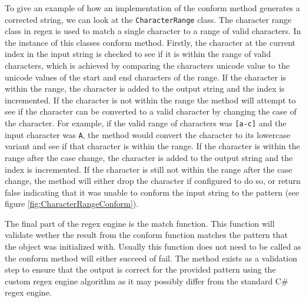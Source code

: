 
To give an example of how an implementation of the conform method generates a corrected string, we can look at the \texttt{CharacterRange} class. The character range class in regex is used to match a single character to a range of valid characters. In the instance of this classes conform method. Firstly, the character at the current index in the input string is checked to see if it is within the range of valid characters, which is achieved by comparing the characters unicode value to the unicode values of the start and end characters of the range. If the character is within the range, the character is added to the output string and the index is incremented. If the character is not within the range the method will attempt to see if the character can be converted to a valid character by changing the case of the character. For example, if the valid range of characters was \texttt{[a-c]} and the input character was \texttt{A}, the method would convert the character to its lowercase variant and see if that character is within the range. If the character is within the range after the case change, the character is added to the output string and the index is incremented. If the character is still not within the range after the case change, the method will either drop the character if configured to do so, or return false indicating that it was unable to conform the input string to the pattern (see figure \ref{fig:CharacterRangeConform}).

The final part of the regex engine is the match function. This function will validate wether the result from the conform function matches the pattern that the object was initialized with. Usually this function does not need to be called as the conform method will either succeed of fail. The method exists as a validation step to ensure that the output is correct for the provided pattern using the custom regex engine algorithm as it may possibly differ from the standard C\# regex engine.
